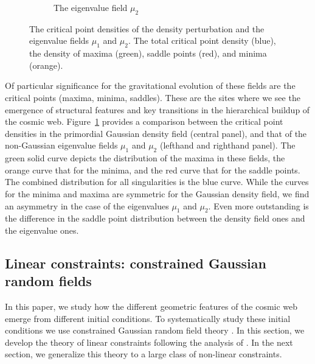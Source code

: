 \documentclass[a4paper, 11pt]{article}
\begin{document}
\begin{figure}
\begin{subfigure}[b]{0.32\textwidth}
\caption{The eigenvalue field $\mu_2$}
\end{subfigure}
\caption{The critical point densities of the density perturbation and the eigenvalue fields $\mu_1$ and $\mu_2$. The total critical point density (blue), the density of maxima (green), saddle points (red), and minima (orange).}\label{fig:critical}
\end{figure}

Of particular significance for the gravitational evolution of these fields are the critical points (maxima, minima, saddles). These are the sites where we see the emergence of structural features and key transitions in the hierarchical buildup of the cosmic web. Figure~\ref{fig:critical} provides a comparison between the critical point densities in the primordial Gaussian density field (central panel), and that of the non-Gaussian eigenvalue fields $\mu_1$ and $\mu_2$ (lefthand and righthand panel). The green solid curve depicts the distribution of the maxima in these fields, the orange curve that for the minima, and the red curve that for the saddle points. The combined distribution for all singularities is the blue curve. While the curves for the minima and maxima are symmetric for the Gaussian density field, we find an asymmetry in the case of the eigenvalues $\mu_1$ and $\mu_2$. Even more outstanding is the difference in the saddle point distribution between the density field ones and the eigenvalue ones. 

\bigskip
\subsection{Linear constraints: constrained Gaussian random fields}
In this paper, we study how the different geometric features of the cosmic web emerge from different initial conditions. To systematically study these initial conditions we use constrained Gaussian random field theory \cite{Bertschinger:1987, Hoffman:1991, Sheth:1995, Weygaert:1996}. In this section, we develop the theory of linear constraints following the analysis of \cite{Weygaert:1996}. In the next section, we generalize this theory to a large class of non-linear constraints. %
\end{document}
